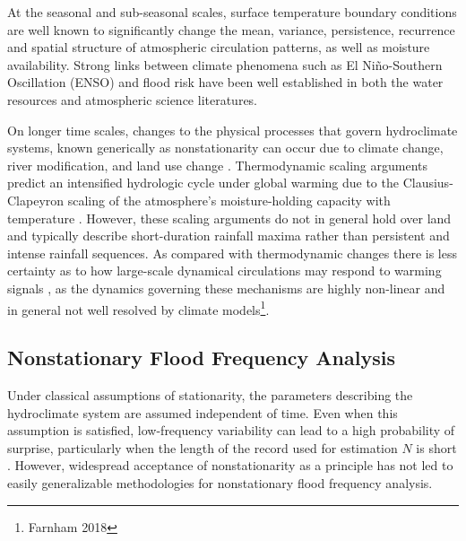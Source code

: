 \documentclass[12pt]{article}
\begin{document}
At the seasonal and sub-seasonal scales, surface temperature boundary conditions are well known to significantly change the mean, variance, persistence, recurrence and spatial structure of atmospheric circulation patterns, as well as moisture availability.
Strong links between climate phenomena such as El Ni\~no-Southern Oscillation (ENSO) and flood risk have been well established in both the water resources \citep[\ie{}][]{Ward2014} and atmospheric science \citep{Tedeschi2013} literatures.

On longer time scales, changes to the physical processes that govern hydroclimate systems, known generically as nonstationarity \citep{Milly2008} can occur due to climate change, river modification, and land use change \citep{Merz2014}.
Thermodynamic scaling arguments predict an intensified hydrologic cycle under global warming due to the Clausius-Clapeyron scaling of the atmosphere's moisture-holding capacity with temperature \citep[see][]{Muller2011,OGorman2015}.
However, these scaling arguments do not in general hold over land \citep{Byrne2015} and typically describe short-duration rainfall maxima rather than persistent and intense rainfall sequences.
As compared with thermodynamic changes there is less certainty as to how large-scale dynamical circulations may respond to warming signals \citep{Shaw2016,Barnes2015}, as the dynamics governing these mechanisms are highly non-linear \citep{Palmer2013} and in general not well resolved by climate models\footnote{Farnham 2018}.

\subsection{Nonstationary Flood Frequency Analysis\label{sec:ffa}}

Under classical assumptions of stationarity, the parameters describing the hydroclimate system are assumed independent of time.
Even when this assumption is satisfied, low-frequency variability can lead to a high probability of surprise, particularly when the length of the record used for estimation \(N\) is short \citep{Jain2001,Matalas2012}.
However, widespread acceptance of nonstationarity as a principle has not led to easily generalizable methodologies for nonstationary flood frequency analysis.
\end{document}
